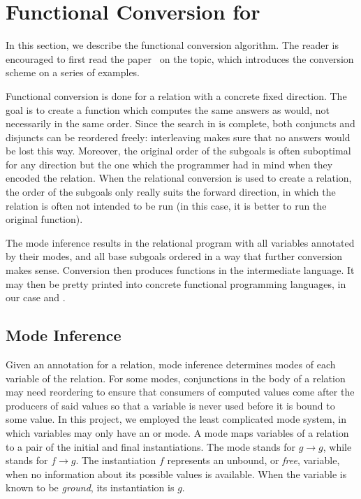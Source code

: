\section{Functional Conversion for \mk}
\label{sec:conversion}

In this section, we describe the functional conversion algorithm.
The reader is encouraged to first read the paper~\cite{verbitskaia2022direction} on the topic, which introduces the conversion scheme on a series of examples.

Functional conversion is done for a relation with a concrete fixed direction.
The goal is to create a function which computes the same answers as \mk would, not necessarily in the same order.
Since the search in \mk is complete, both conjuncts and disjuncts can be reordered freely: interleaving makes sure that no answers would be lost this way.
Moreover, the original order of the subgoals is often suboptimal for any direction but the one which the programmer had in mind when they encoded the relation.
When the relational conversion is used to create a relation, the order of the subgoals only really suits the forward direction, in which the relation is often not intended to be run (in this case, it is better to run the original function).

The mode inference results in the relational program with all variables annotated by their modes, and all base subgoals ordered in a way that further conversion makes sense.
Conversion then produces functions in the intermediate language.
It may then be pretty printed into concrete functional programming languages, in our case \haskell and \ocaml.


\subsection{Mode Inference}


Given an annotation for a relation, mode inference determines modes of each variable of the relation.
For some modes, conjunctions in the body of a relation may need reordering to ensure that consumers of computed values come after the producers of said values so that a variable is never used before it is bound to some value.
In this project, we employed the least complicated mode system, in which variables may only have an \inm or \outm mode.
A mode maps variables of a relation to a pair of the initial and final instantiations.
The mode \inm stands for $g \rightarrow g$, while \outm stands for $f \rightarrow g$.
The instantiation $f$ represents an unbound, or \emph{free}, variable, when no information about its possible values is available.
When the variable is known to be \emph{ground}, its instantiation is $g$.

